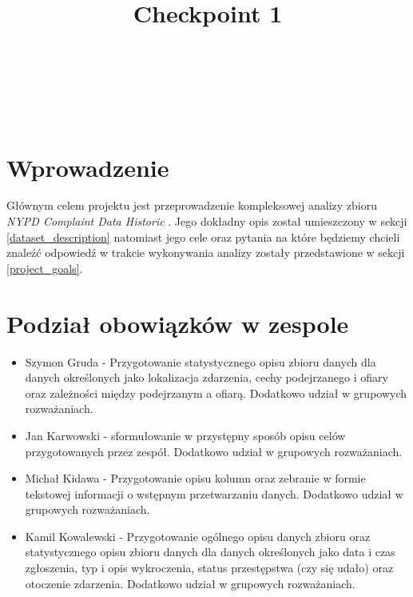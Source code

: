 \documentclass{classrep}
\author{%
    \studentinfo[239661@edu.p.lodz.pl]{Szymon Gruda}{239661}\\
    \studentinfo[239671@edu.p.lodz.pl]{Jan Karwowski}{239671}\\
    \studentinfo[239673@edu.p.lodz.pl]{Michał Kidawa}{239673}\\
    \studentinfo[239676@edu.p.lodz.pl]{Kamil Kowalewski}{239676}\\
}
\title{Checkpoint 1}
\begin{document}
    \maketitle
    \thispagestyle{fancyplain}

    \tableofcontents
    \newpage

    \section{Wprowadzenie} {
        Głównym celem projektu jest przeprowadzenie kompleksowej analizy zbioru
        \textit{NYPD Complaint Data Historic} \cite{nypd_dataset}. Jego dokładny opis
        został umieszczony w sekcji \ref{dataset_description} natomiast jego cele oraz
        pytania na które będziemy chcieli znaleźć odpowiedź w trakcie wykonywania
        analizy zostały przedstawione w sekcji \ref{project_goals}.
    }

    \section{Podział obowiązków w zespole} {
        \begin{itemize}
            \item Szymon Gruda - Przygotowanie statystycznego opisu zbioru danych dla danych określonych jako lokalizacja zdarzenia, cechy podejrzanego i ofiary oraz zależności między podejrzanym a ofiarą. Dodatkowo udział w grupowych rozważaniach.
            \item Jan Karwowski - sformułowanie w przystępny sposób opisu celów przygotowanych przez zespół. Dodatkowo udział w grupowych rozważaniach.
            \item Michał Kidawa - Przygotowanie opisu kolumn oraz zebranie w formie tekstowej informacji o wstępnym przetwarzaniu danych.  Dodatkowo udział w grupowych rozważaniach.
            \item Kamil Kowalewski - Przygotowanie ogólnego opisu danych zbioru oraz  statystycznego opisu zbioru danych dla danych określonych jako data i czas zgłoszenia, typ i opis wykroczenia, status przestępstwa (czy się udało) oraz otoczenie zdarzenia. Dodatkowo udział w grupowych rozważaniach.
        \end{itemize}
    }
\end{document}
